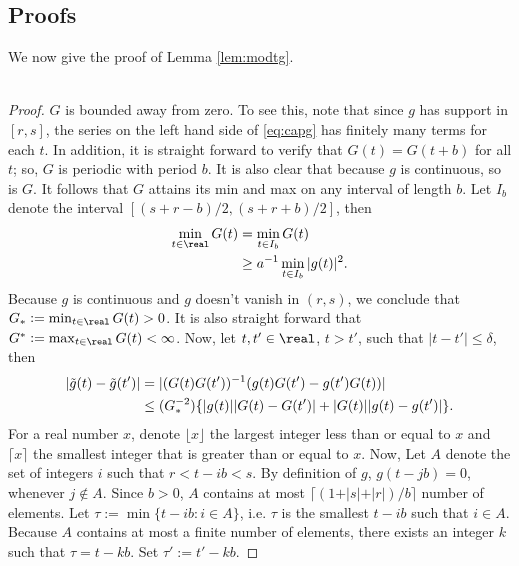 \begin{appendices}
  \section{Proofs}\label{ap:proof}
  We now give the proof of Lemma \eqref{lem:modtg}. \\ \\
  \begin{proof}
   $G$ is bounded away from zero. To see this, note that since $g$ has support in  $[r,s]$, the series on the left hand side of \eqref{eq:capg} has finitely many terms for each $t$.  In addition, it is straight forward to verify that $G(t) = G(t+b)$ for all $t$; so,  $G$ is periodic with period $b$. It is also clear that because $g$ is continuous, so is $G$. It follows that $G$ attains its min and max on any interval of length $b$. Let $I_b$ denote the interval $[(s+r -b)/2, (s+r +b)/2]$, then
  \begin{align}
    \min_{t\in\real} G(t) &=  \min_{t \in I_b} G(t) \notag\\
    & \ge  a^{-1}\min_{t \in I_b}\vert g(t)\vert^2.\notag
    \label{}
  \end{align}  
  Because $g$ is continuous and $g$ doesn't vanish in $(r,s)$, we conclude that $G_*:=\min_{t \in \real}G(t) > 0$. It is also straight forward that $G^* := \max_{t \in \real}G(t) < \infty$. Now, let $t, t' \in \real$, $ t > t'$,  such that $\vert t - t' \vert \le \delta$, then 
  \begin{align}
     \vert \tilde{g}(t) - \tilde{g}(t')\vert & = \vert (G(t)G(t'))^{-1}(g(t)G(t') - g(t')G(t))\vert  \notag\\
    & \le (G_*^{-2})\{\vert g(t)\vert \vert G(t) - G(t') \vert + \vert G(t)\vert \vert g(t) - g(t')\vert\}. 
    \label{eq:difftg}
  \end{align}
For a real number  $x$, denote $\lfloor x \rfloor$  the largest integer less than or equal to $x$ and $\lceil x \rceil$  the smallest integer that is greater  than or equal to $x$. Now,
Let $A$ denote the set of integers $i$ such that $r < t - ib < s$. By definition of $g$, $g(t - j b) = 0$, whenever $j \not\in A$. Since $b > 0$, $A$ contains at most $\lceil( 1 + \vert s \vert + \vert r \vert)/b \rceil$ number of elements.  Let $\tau := \min \{t - ib: i \in A\}$, i.e. $\tau$ is the smallest $t - ib$ such that $i \in A$. Because $A$ contains at most a finite number of elements, there exists an integer $k$ such that $\tau = t - kb$. Set $\tau' := t'-kb$.   
  

\end{proof}
\end{appendices}
